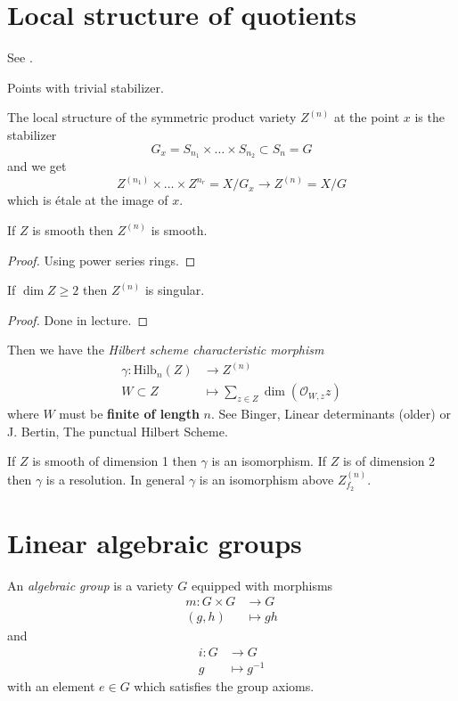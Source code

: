 \section{Local structure of quotients}
\label{section-local-structure-of-quotients}

See \cite{AVar}.

\begin{definition}
\label{definition-free-locus}
Points with trivial stabilizer.
\end{definition}

The local structure of  the symmetric product
variety $Z^{(n)}$ at the point $x$ is the
stabilizer
$$
G_x=S_{n_1}\times\ldots\times S_{n_2}\subset
S_n=G
$$
and we get
$$
Z^{(n_1)}\times\ldots\times Z^{n_r} = X/G_x
\to Z^{(n)}=X/G
$$
which is \'etale at the image of $x$.

\begin{proposition}
\label{git-label-002}
If $Z$ is smooth then $Z^{(n)}$ is smooth.
\end{proposition}

\begin{proof}
Using power series rings.
\end{proof}

\begin{proposition}
\label{git-label-003}
If $\dim Z \geq 2$ then $Z^{(n)}$ is
singular.
\end{proposition}

\begin{proof}
Done in lecture.
\end{proof}

\medskip\noindent
Then we have the {\it Hilbert scheme
characteristic morphism}
$$
\begin{aligned}
\gamma: \text{Hilb}_n(Z) &\longrightarrow
Z^{(n)} \\
W\subset Z &\longmapsto \sum_{z \in Z}\dim
(\mathcal{O}_{W,z}z)
\end{aligned}
$$
where $W$ must be {\bf finite of length }$n$.
See Binger, Linear determinants (older) or J.
Bertin, The punctual Hilbert Scheme.

If $Z$ is smooth of dimension 1 then $\gamma$
is an isomorphism. If $Z$ is of dimension 2
then $\gamma$ is a resolution. In general
$\gamma$ is an isomorphism above
$Z_{f_2}^{(n)}$.

\section{Linear algebraic groups}
\label{section-linear-algebraic-groups}
\begin{definition}
\label{definition-algebraic-group}
An {\it algebraic group} is a variety $G$
equipped with morphisms
$$
\begin{aligned}
m: G\times G &\longrightarrow G \\
(g,h) &\longmapsto gh
\end{aligned}
$$
and
$$
\begin{aligned}
i: G &\longrightarrow G \\
g &\longmapsto g^{-1}
\end{aligned}
$$
with an element $e \in G$ which satisfies the
group axioms.
\end{definition}

